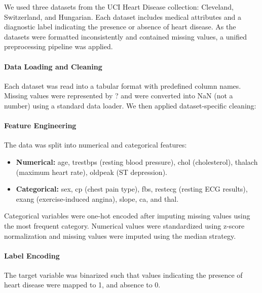 \documentclass{article}
\begin{document}
We used three datasets from the UCI Heart Disease collection: Cleveland, Switzerland, and Hungarian. Each dataset includes medical attributes and a diagnostic label indicating the presence or absence of heart disease. As the datasets were formatted inconsistently and contained missing values, a unified preprocessing pipeline was applied.



\paragraph{Data Loading and Cleaning}

Each dataset was read into a tabular format with predefined column names. Missing values were represented by ? and were converted into NaN (not a number) using a standard data loader. We then applied dataset-specific cleaning:


\paragraph{Feature Engineering}

The data was split into numerical and categorical features:

\begin{itemize}

\item \textbf{Numerical:} age, trestbps (resting blood pressure), chol (cholesterol), thalach (maximum heart rate), oldpeak (ST depression).

\item \textbf{Categorical:} sex, cp (chest pain type), fbs, restecg (resting ECG results), exang (exercise-induced angina), slope, ca, and thal.

\end{itemize}

Categorical variables were one-hot encoded after imputing missing values using the most frequent category. Numerical values were standardized using z-score normalization and missing values were imputed using the median strategy.



\paragraph{Label Encoding}

The target variable was binarized such that values indicating the presence of heart disease were mapped to 1, and absence to 0.
\end{document}
